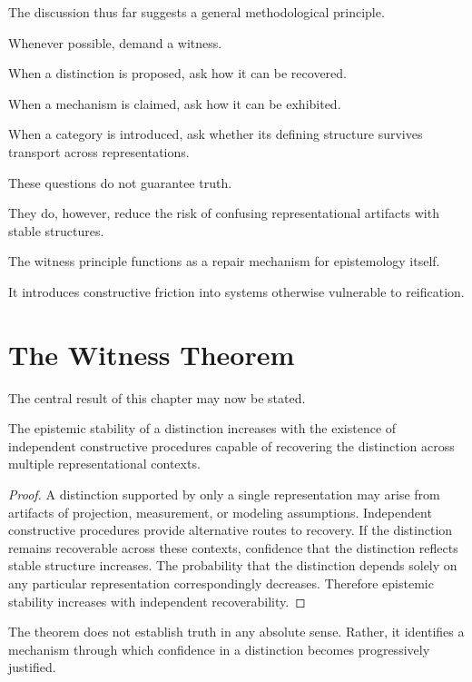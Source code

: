 \documentclass[11pt,oneside,openany]{book}
\begin{document}
The discussion thus far suggests a general methodological principle.

Whenever possible, demand a witness.

When a distinction is proposed, ask how it can be recovered.

When a mechanism is claimed, ask how it can be exhibited.

When a category is introduced, ask whether its defining structure survives transport across representations.

These questions do not guarantee truth.

They do, however, reduce the risk of confusing representational artifacts with stable structures.

The witness principle functions as a repair mechanism for epistemology itself.

It introduces constructive friction into systems otherwise vulnerable to reification.

\section{The Witness Theorem}

The central result of this chapter may now be stated.

\begin{theorem}

The epistemic stability of a distinction increases with the existence of independent constructive procedures capable of recovering the distinction across multiple representational contexts.

\end{theorem}

\begin{proof}

A distinction supported by only a single representation may arise from artifacts of projection, measurement, or modeling assumptions. Independent constructive procedures provide alternative routes to recovery. If the distinction remains recoverable across these contexts, confidence that the distinction reflects stable structure increases. The probability that the distinction depends solely on any particular representation correspondingly decreases. Therefore epistemic stability increases with independent recoverability.

\end{proof}

The theorem does not establish truth in any absolute sense. Rather, it identifies a mechanism through which confidence in a distinction becomes progressively justified.
\end{document}
